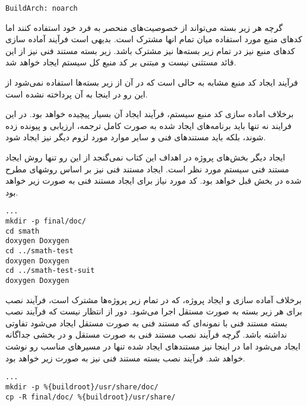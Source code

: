 \begin{latin}
\lstset{language=TeX}  
\begin{lstlisting}
BuildArch: noarch
\end{lstlisting}
\end{latin}

گرچه هر زیر بسته می‌تواند از خصوصیت‌های منحصر به فرد خود استفاده کنند اما کدهای
منبع مورد استفاده میان تمام انها مشترک است. بدیهی است  فرآیند آماده سازی کدهای
منبع نیز در تمام زیر بسته‌ها نیز مشترک باشد. زیر بسته مستند فنی نیز از این قائد
مستثنی نیست و مبتنی بر کد منبع کل سیستم ایجاد خواهد شد.

\begin{note}
فرآیند ایجاد کد منبع مشابه به حالی است که در آن از زیر بسته‌ها استفاده نمی‌شود
از این رو در اینجا به آن پرداخته نشده است.
\end{note}

برخلاف اماده سازی کد منبع سیستم، فرآیند ایجاد آن بسیار پیچیده خواهد بود. در این
فرایند نه تنها باید برنامه‌های ایجاد شده به صورت کامل ترجمه، ارزیابی و پیونده
زده شوند، بلکه باید مستندهای فنی و سایر موارد مورد لزوم دیگر نیز ایجاد شود.

ایجاد دیگر بخش‌های پروژه در اهداف این کتاب نمی‌گنجد از این رو تنها روش ایجاد
مستند فنی سیستم مورد نظر است. ایجاد مستند فنی نیز بر اساس روشهای مطرح شده در
بخش قبل خواهد بود. کد مورد نیاز برای ایجاد مستند فنی به صورت زیر خواهد بود.

\begin{latin}
\lstset{language=TeX}  
\begin{lstlisting}[frame=single] 
%build
...
mkdir -p final/doc/
cd smath
doxygen Doxygen
cd ../smath-test
doxygen Doxygen
cd ../smath-test-suit
doxygen Doxygen
\end{lstlisting}
\end{latin}

برخلاف آماده سازی و ایجاد پروژه، که در تمام زیر پروژه‌ها مشترک است، فرآیند نصب
برای هر زیر بسته به صورت مستقل اجرا می‌شود. دور از انتظار نیست که فرآیند نصب
بسته مستند فنی با نمونه‌ای که مستند فنی به صورت مستقل ایجاد می‌شود تفاوتی نداشته
باشد. گرچه فرآیند نصب مستند فنی به صورت مستقل و در بخشی جداگانه ایجاد می‌شود اما
در اینجا نیز مستندهای ایجاد شده تنها در مسیرهای مناسب رو نوشت خواهد شد. فرآیند
نصب بسته مستند فنی نیز به صورت زیر خواهد بود.

\begin{latin}
\lstset{language=TeX}  
\begin{lstlisting}[frame=single] 
%install doc
...
mkdir -p %{buildroot}/usr/share/doc/
cp -R final/doc/ %{buildroot}/usr/share/
\end{lstlisting}
\end{latin}

